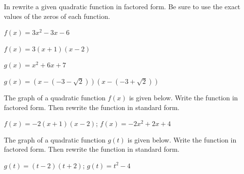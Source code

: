 \noindent In   rewrite a given quadratic function in factored form. Be sure to use the exact values of the zeros of each function.


\begin{exercise}\label{exercise-3.4.16}
$f(x)=3x^2-3x-6$
\end{exercise}

\begin{solution}
     $f(x)=3(x+1)(x-2)$
\end{solution}



\begin{exercise}\label{exercise-3.4.17}
$g(x)=x^2+6x+7$
\end{exercise}

\begin{solution}
    $g(x)=\left(x-(-3-\sqrt{2})\right)\left(x-(-3+\sqrt{2})\right)$ 
\end{solution}







\begin{exercise} The graph of a quadratic function $f(x)$ is given below. Write the function in factored form. Then rewrite the function in standard form.

\begin{center}
\end{center}

\end{exercise}


\begin{solution}
    $f(x)=-2(x+1)(x-2)$; $f(x)=-2x^2+2x+4$
\end{solution}



\begin{exercise} The graph of a quadratic function $g(t)$ is given below. Write the function in factored form. Then rewrite the function in standard form.

\begin{center}
\end{center}

\end{exercise}


\begin{solution}
    $g(t)=(t-2)(t+2)$; $g(t)=t^2-4$
\end{solution}


